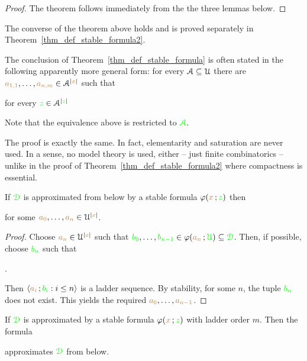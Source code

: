 \documentclass[creche.tex]{subfiles}
\begin{document}
\begin{proof}
The theorem follows immediately from the the three lemmas below.
\end{proof}

The converse of the theorem above holds and is proved separately in Theorem~\ref{thm_def_stable_formula2}.  

\begin{remark}
The conclusion of Theorem~\ref{thm_def_stable_formula} is often stated in the following  apparently more general form:
for every $\EuScript A\subseteq\EuScript U$ there are ${\color{brown} a_{1,1}},\dots,{\color{brown} a_{n,m}}\in \EuScript A^{|{\color{brown} x}|}$ such that

\hfill for every ${\color{green} z}\in\EuScript A^{|{\color{green} z}|}$ 

Note that the equivalence above is restricted to ${\color{green}\EuScript A}$.

The proof is exactly the same. In fact, elementarity and saturation are never used. In a sense, no model theory is used, either -- just finite combinatorics -- unlike in the proof of Theorem~\ref{thm_def_stable_formula2} where compactness is essential.\QED
\end{remark}



\begin{lemma}
If ${\color{green}\EuScript D}$ is approximated from below by a stable formula $\varphi({\color{brown} x}\,;{\color{green} z})$ then


for some ${\color{brown} a_0},\dots,{\color{brown} a_n}\in\EuScript U^{|{\color{brown} x}|}$. 
\end{lemma}

\begin{proof}
Choose ${\color{brown} a_n}\in\EuScript U^{|{\color{brown} x}|}$ such that ${\color{green} b_0},\dots,{\color{green} b_{n-1}}\in\varphi({\color{brown} a_n}\,;{\color{green}\EuScript U})\subseteq{\color{green}\EuScript D}$.
Then, if possible, choose ${\color{green} b_n}$ such that

.

Then $\langle{\color{brown}a_i}\,;{\color{green} b_i} : i\le n\rangle$ is a ladder sequence. 
By stability, for some $n$, the tuple ${\color{green} b_n}$ does not exist.
This yields the required  ${\color{brown} a_0},\dots,{\color{brown} a_{n-1}}$.
\end{proof}


\begin{lemma}
If ${\color{green}\EuScript D}$ is approximated by a stable formula $\varphi({\color{brown} x}\,;{\color{green} z})$ with ladder order $m$.
Then the formula 


approximates ${\color{green}\EuScript D}$ from below.
\end{lemma}
\end{document}
